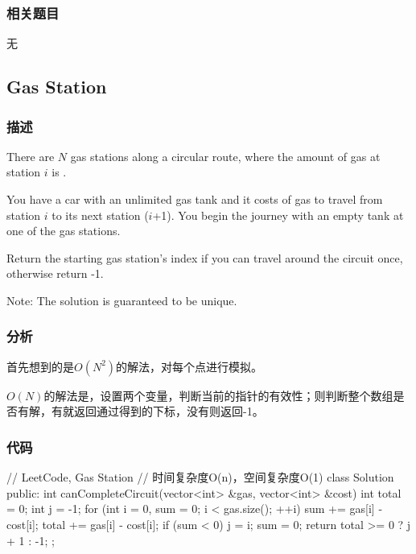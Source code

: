 \subsubsection{相关题目}
\begindot
\item 无
\myenddot


\subsection{Gas Station} %
\label{sec:gas-station}


\subsubsection{描述}
There are $N$ gas stations along a circular route, where the amount of gas at station $i$ is .

You have a car with an unlimited gas tank and it costs  of gas to travel from station $i$ to its next station ($i$+1). You begin the journey with an empty tank at one of the gas stations.

Return the starting gas station's index if you can travel around the circuit once, otherwise return -1.

Note:
The solution is guaranteed to be unique.


\subsubsection{分析}
首先想到的是$O(N^2)$的解法，对每个点进行模拟。

$O(N)$的解法是，设置两个变量，判断当前的指针的有效性；则判断整个数组是否有解，有就返回通过得到的下标，没有则返回-1。


\subsubsection{代码}
\begin{Code}
// LeetCode, Gas Station
// 时间复杂度O(n)，空间复杂度O(1)
class Solution {
public:
    int canCompleteCircuit(vector<int> &gas, vector<int> &cost) {
        int total = 0;
        int j = -1;
        for (int i = 0, sum = 0; i < gas.size(); ++i) {
            sum += gas[i] - cost[i];
            total += gas[i] - cost[i];
            if (sum < 0) {
                j = i;
                sum = 0;
            }
        }
        return total >= 0 ? j + 1 : -1;
    }
};
\end{Code}



